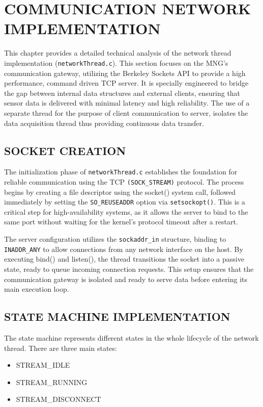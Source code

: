 \clearpage 
\section{COMMUNICATION NETWORK IMPLEMENTATION}
This chapter provides a detailed technical analysis of the network thread implementation (\texttt{networkThread.c}). This section focuses on the MNG’s communication gateway, utilizing the Berkeley Sockets API to provide a high performance, command driven TCP server. It is specially engineered to bridge the gap between internal data structures and external clients, ensuring that sensor data is delivered with minimal latency and high reliability. The use of a separate thread for the purpose of client communication to server, isolates the data acquisition thread thus providing continuous data transfer.


\subsection{SOCKET CREATION}
The initialization phase of \texttt{networkThread.c} establishes the foundation for reliable communication using the TCP \texttt{(SOCK\_STREAM)} protocol. The process begins by creating a file descriptor using the socket() system call, followed immediately by setting the \texttt{SO\_REUSEADDR} option via \texttt{setsockopt()}. This is a critical step for high-availability systems, as it allows the server to bind to the same port without waiting for the kernel’s protocol timeout after a restart.

The server configuration utilizes the \texttt{sockaddr\_in} structure, binding to \texttt{INADDR\_ANY} to allow connections from any network interface on the host. By executing bind() and listen(), the thread transitions the socket into a passive state, ready to queue incoming connection requests. This setup ensures that the communication gateway is isolated and ready to serve data before entering its main execution loop.

\subsection{STATE MACHINE IMPLEMENTATION}
The state machine represents different states in the whole lifecycle of the network thread. There are three main states:
\begin{itemize}
\item STREAM\_IDLE
\item STREAM\_RUNNING
\item STREAM\_DISCONNECT
\end{itemize}

